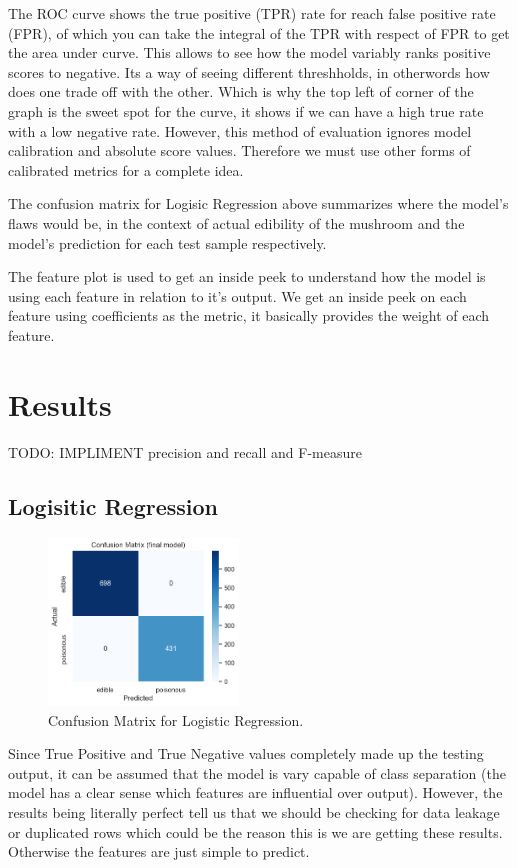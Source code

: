 \documentclass[conference]{IEEEtran}
\begin{document}
The ROC curve shows the true positive (TPR) rate for reach false positive rate (FPR), of which you can take the integral of the TPR with respect of FPR to get the area under curve. This allows to see how the model variably ranks positive scores to negative. Its a way of seeing different threshholds, in otherwords how does one trade off with the other. Which is why the top left of corner of the graph is the sweet spot for the curve, it shows if we can have a high true rate with a low negative rate. However, this method of evaluation ignores model calibration and absolute score values. Therefore we must use other forms of calibrated metrics for a complete idea.

The confusion matrix for Logisic Regression above summarizes where the model's flaws would be, in the context of actual edibility of the mushroom and the model's prediction for each test sample respectively.

The feature plot is used to get an inside peek to understand how the model is using each feature in relation to it's output. We get an inside peek on each feature using coefficients as the metric, it basically provides the weight of each feature.


\section{Results}

TODO: IMPLIMENT precision and recall and F-measure
\subsection{Logisitic Regression}
\begin{figure}[!htbp]
\centering
\includegraphics[width=0.45\textwidth]{images/logConf.png}
\caption{Confusion Matrix for Logistic Regression.}
\label{fig:log_confusion}
\end{figure}
\FloatBarrier

Since True Positive and True Negative values completely made up the testing output, it can be assumed that the model is vary capable of class separation (the model has a clear sense which features are influential over output). However, the results being literally perfect tell us that we should be checking for data leakage or duplicated rows which could be the reason this is we are getting these results. Otherwise the features are just simple to predict.
\end{document}
